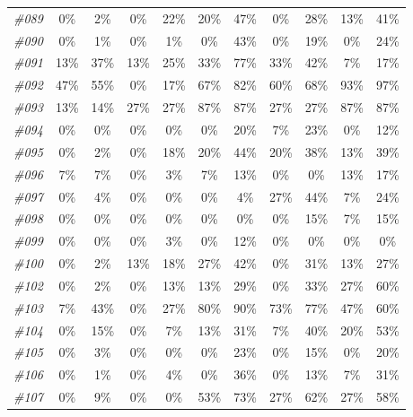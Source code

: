 \begin{table}[t]
\begin{tabular}{ccccccccccc}
    \textit{\#089} & 0\%   & 2\%   & 0\%   & 22\%  & 20\%  & 47\%  & 0\%   & 28\%  & 13\%  & 41\% \\
    \textit{\#090} & 0\%   & 1\%   & 0\%   & 1\%   & 0\%   & 43\%  & 0\%   & 19\%  & 0\%   & 24\% \\
    \textit{\#091} & 13\%  & 37\%  & 13\%  & 25\%  & 33\%  & 77\%  & 33\%  & 42\%  & 7\%   & 17\% \\
    \textit{\#092} & 47\%  & 55\%  & 0\%   & 17\%  & 67\%  & 82\%  & 60\%  & 68\%  & 93\%  & 97\% \\
    \textit{\#093} & 13\%  & 14\%  & 27\%  & 27\%  & 87\%  & 87\%  & 27\%  & 27\%  & 87\%  & 87\% \\
    \textit{\#094} & 0\%   & 0\%   & 0\%   & 0\%   & 0\%   & 20\%  & 7\%   & 23\%  & 0\%   & 12\% \\
    \textit{\#095} & 0\%   & 2\%   & 0\%   & 18\%  & 20\%  & 44\%  & 20\%  & 38\%  & 13\%  & 39\% \\
    \textit{\#096} & 7\%   & 7\%   & 0\%   & 3\%   & 7\%   & 13\%  & 0\%   & 0\%   & 13\%  & 17\% \\
    \textit{\#097} & 0\%   & 4\%   & 0\%   & 0\%   & 0\%   & 4\%   & 27\%  & 44\%  & 7\%   & 24\% \\
    \textit{\#098} & 0\%   & 0\%   & 0\%   & 0\%   & 0\%   & 0\%   & 0\%   & 15\%  & 7\%   & 15\% \\
    \textit{\#099} & 0\%   & 0\%   & 0\%   & 3\%   & 0\%   & 12\%  & 0\%   & 0\%   & 0\%   & 0\% \\
    \textit{\#100} & 0\%   & 2\%   & 13\%  & 18\%  & 27\%  & 42\%  & 0\%   & 31\%  & 13\%  & 27\% \\
    \textit{\#102} & 0\%   & 2\%   & 0\%   & 13\%  & 13\%  & 29\%  & 0\%   & 33\%  & 27\%  & 60\% \\
    \textit{\#103} & 7\%   & 43\%  & 0\%   & 27\%  & 80\%  & 90\%  & 73\%  & 77\%  & 47\%  & 60\% \\
    \textit{\#104} & 0\%   & 15\%  & 0\%   & 7\%   & 13\%  & 31\%  & 7\%   & 40\%  & 20\%  & 53\% \\
    \textit{\#105} & 0\%   & 3\%   & 0\%   & 0\%   & 0\%   & 23\%  & 0\%   & 15\%  & 0\%   & 20\% \\
    \textit{\#106} & 0\%   & 1\%   & 0\%   & 4\%   & 0\%   & 36\%  & 0\%   & 13\%  & 7\%   & 31\% \\
    \textit{\#107} & 0\%   & 9\%   & 0\%   & 0\%   & 53\%  & 73\%  & 27\%  & 62\%  & 27\%  & 58\% \\
    \bottomrule
    \end{tabular}%
  \label{tab:exp_AgilexCobotMagic_2}%
\end{table}%


